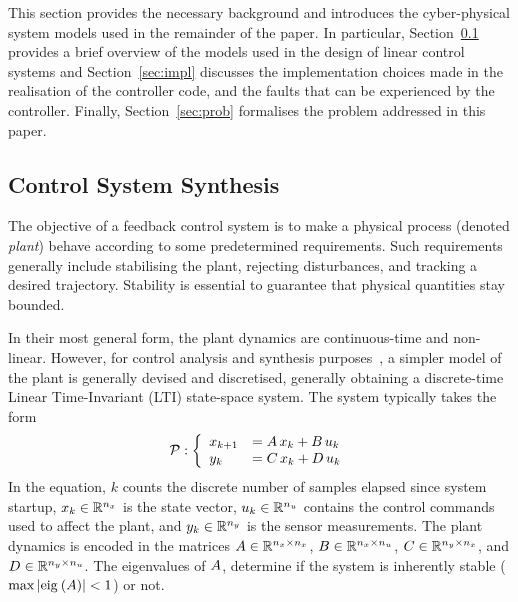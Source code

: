 %
This section provides the necessary background and introduces the cyber-physical system models used in the remainder of the paper.
In particular, Section~\ref{sec:control} provides a brief overview of the models used in the design of linear control systems and Section~\ref{sec:impl} discusses the implementation choices made in the realisation of the controller code, and the faults that can be experienced by the controller.
Finally, Section~\ref{sec:prob} formalises the problem addressed in this paper.

\subsection{Control System Synthesis}%
\label{sec:control}%
%
The objective of a feedback control system is to make a physical process (denoted \emph{plant}) behave according to some predetermined requirements.
Such requirements generally include stabilising the plant, rejecting disturbances, and tracking a desired trajectory.
Stability is essential to guarantee that physical quantities stay bounded.

In their most general form, the plant dynamics are continuous-time and non-linear.
However, for control analysis and synthesis purposes~\cite{Astrom:1997}, a simpler model of the plant is generally devised and discretised, generally obtaining a discrete-time Linear Time-Invariant (LTI) state-space system.
The system typically takes the form
%
\begin{equation}
    \label{eq:plant} 
    \plant: \left\{\begin{array}{ll}
        x_{k+1} &= \Ap\,x_k+\Bp\,u_k\\
        y_k     &= \Cp\,x_k+\Dp\,u_k
    \end{array}\right.
\end{equation}
%
In the equation, $k$ counts the discrete number of samples elapsed since system startup, $x_k \in \mathbb{R}^{n_x}$ is the state vector, $u_k \in \mathbb{R}^{n_u}$ contains the control commands used to affect the plant, and $y_k \in \mathbb{R}^{n_y}$ is the sensor measurements.
The plant dynamics is encoded in the matrices $A \in \mathbb{R}^{n_x \times n_x}$, $B \in \mathbb{R}^{n_x \times n_u}$, $C \in \mathbb{R}^{n_y \times n_x}$, and $D \in \mathbb{R}^{n_y \times n_u}$.
The eigenvalues of $A$, determine if the system is inherently stable ($\max{\left|\mathrm{eig}_{}\left( A\right)\right|} < 1$) or not.

